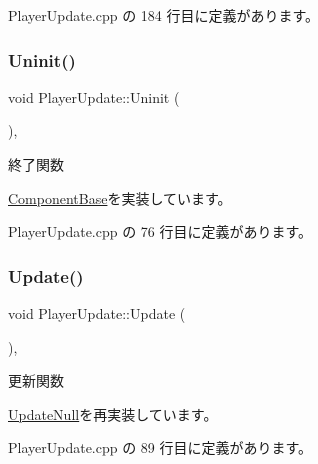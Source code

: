 Player\+Update.\+cpp の 184 行目に定義があります。

\mbox{\label{class_player_update_a997e0813a825d7525da4b5b89a290168}} 
\subsubsection{\texorpdfstring{Uninit()}{Uninit()}}
{\footnotesize\ttfamily void Player\+Update\+::\+Uninit (\begin{DoxyParamCaption}{ }\end{DoxyParamCaption})\hspace{0.3cm}{\ttfamily [override]}, {\ttfamily [virtual]}}



終了関数 



\mbox{\hyperlink{class_component_base_a9f42beaf0383d6f629819579cab4de57}{Component\+Base}}を実装しています。



 Player\+Update.\+cpp の 76 行目に定義があります。

\mbox{\label{class_player_update_af6e1b8ca60399f232e64d2acb4968c75}} 
\subsubsection{\texorpdfstring{Update()}{Update()}}
{\footnotesize\ttfamily void Player\+Update\+::\+Update (\begin{DoxyParamCaption}{ }\end{DoxyParamCaption})\hspace{0.3cm}{\ttfamily [override]}, {\ttfamily [virtual]}}



更新関数 



\mbox{\hyperlink{class_update_null_a692f4f34e4ef35ca286a1d3606fdf473}{Update\+Null}}を再実装しています。



 Player\+Update.\+cpp の 89 行目に定義があります。

